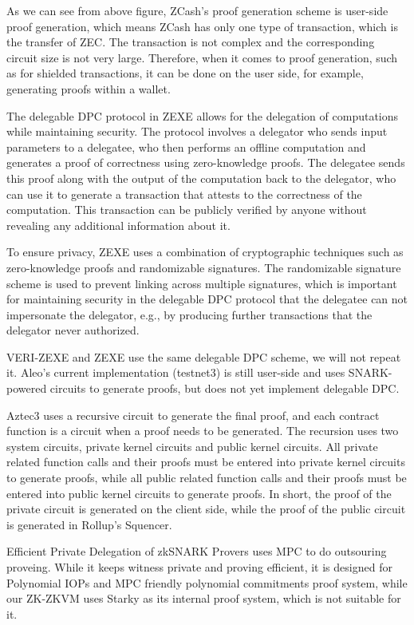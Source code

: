 As we can see from above figure, ZCash's proof generation scheme is user-side proof generation, which means ZCash has only one type of transaction, which is the transfer of ZEC. The transaction is not complex and the corresponding circuit size is not very large. Therefore, when it comes to proof generation, such as for shielded transactions, it can be done on the user side, for example, generating proofs within a wallet.

The delegable DPC protocol in ZEXE\cite{cryptoeprint:2018/962} allows for the delegation of computations while maintaining security. The protocol involves a delegator who sends input parameters to a delegatee, who then performs an offline computation and generates a proof of correctness using zero-knowledge proofs. The delegatee sends this proof along with the output of the computation back to the delegator, who can use it to generate a transaction that attests to the correctness of the computation. This transaction can be publicly verified by anyone without revealing any additional information about it.

To ensure privacy, ZEXE uses a combination of cryptographic techniques such as zero-knowledge proofs and randomizable signatures. The randomizable signature scheme is used to prevent linking across multiple signatures, which is important for maintaining security in the delegable DPC protocol that the delegatee can not impersonate the delegator, e.g., by producing further transactions that the delegator never authorized.

VERI-ZEXE and ZEXE use the same delegable DPC scheme, we will not repeat it. Aleo's current implementation (testnet3\cite{website:aleo-vm}) is still user-side and uses SNARK-powered circuits to generate proofs, but does not yet implement delegable DPC.

Aztec3\cite{website:Aztec3} uses a recursive circuit to generate the final proof, and each contract function is a circuit when a proof needs to be generated. The recursion uses two system circuits, private kernel circuits and public kernel circuits. All private related function calls and their proofs must be entered into private kernel circuits to generate proofs, while all public related function calls and their proofs must be entered into public kernel circuits to generate proofs. In short, the proof of the private circuit is generated on the client side, while the proof of the public circuit is generated in Rollup's Squencer.

Efficient Private Delegation of zkSNARK Provers\cite{website:epdzp} uses MPC to do outsouring proveing. While it keeps witness private and proving efficient, it is designed for Polynomial IOPs and MPC friendly polynomial commitments proof system, while our ZK-ZKVM uses Starky as its internal proof system, which is not suitable for it.

